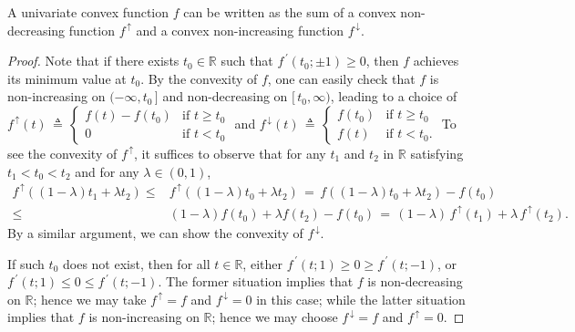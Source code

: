 \documentclass{siamart}
\begin{document}
\begin{lemma}\label{lemma: univariate function}
A univariate convex function $f$ can be written as the
sum of a convex non-decreasing function $f^{\, \uparrow}$ and a convex non-increasing function $f^{\, \downarrow}$.
\end{lemma}
\begin{proof}
%
Note that if there exists $t_0\in \mathbb{R}$ such that $f^{\, \prime}(t_0;\pm 1)\geq 0$, then $f$ achieves its minimum value at
$t_0$.  By the convexity of $f$, one can easily check that $f$ is non-increasing on $(-\infty, t_0\,]$ and non-decreasing on $[\, t_0, \infty)$,
leading to a choice of  $f^{\, \uparrow}(t) \, \triangleq \,\left\{\begin{array}{ll}
f(t) - f(t_0) & \mbox{if $t \geq t_0$} \\
 0 & \mbox{if $t < t_0$}
\end{array} \right.$ and $f^{\, \downarrow}(t) \, \triangleq \, \left\{ \begin{array}{ll}
f(t_0) & \mbox{if $t \geq t_0$}\\
f(t) & \mbox{if $t < t_0$}.
\end{array}\right.$
To see the convexity of $f^{\, \uparrow}$, it suffices to observe that for any $t_1$ and $t_2$ in
$\mathbb{R}$ satisfying $t_1 < t_0 < t_2$ and for any $\lambda\in (0,1)$,
\[ \begin{array}{rl}
f^{\, \uparrow}((1-\lambda)t_1  + \lambda t_2)
 \leq & f^{\, \uparrow}((1-\lambda)t_0  + \lambda t_2) \,= \,f((1-\lambda)t_0  + \lambda t_2)-f(t_0)\\[0.1in]
 \leq & (1-\lambda) f(t_0) + \lambda f(t_2) - f(t_0)
\, = \, (1-\lambda) \, f^{\, \uparrow}(t_1) + \lambda \, f^{\, \uparrow}(t_2).
\end{array}
\]
By a similar argument, we can show the convexity of $f^{\, \downarrow}$.


If such $t_0$ does not exist, then for all $t\in \mathbb{R}$, either $f^{\, \prime}(t;1) \geq 0 \geq f^{\, \prime}(t;-1)$, or
$f^{\, \prime}(t;1) \leq 0 \leq f^{\, \prime}(t;-1)$.  The former situation implies that $f$ is
non-decreasing on $\mathbb{R}$; hence we may take $f^{\, \uparrow}=f$ and $f^{\, \downarrow}=0$ in this case; while the
latter situation implies that $f$ is non-increasing on $\mathbb{R}$; hence we may choose $f^{\, \downarrow} = f$ and $f^{\, \uparrow} =0$.
\end{proof}
\end{document}
